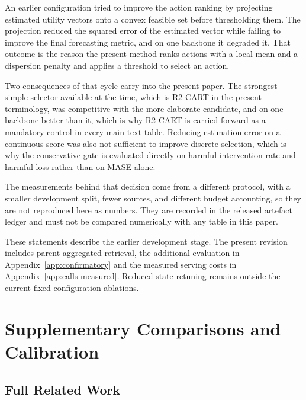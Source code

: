 \documentclass{article}
\begin{document}
An earlier configuration tried to improve the action ranking by projecting estimated utility
vectors onto a convex feasible set before thresholding them. The projection reduced the squared
error of the estimated vector while failing to improve the final forecasting metric, and on one
backbone it degraded it. That outcome is the reason the present method ranks actions with a
local mean and a dispersion penalty and applies a threshold to select an action.

Two consequences of that cycle carry into the present paper. The strongest simple selector
available at the time, which is R2-CART in the present terminology, was competitive with the
more elaborate candidate, and on one backbone better than it, which is why R2-CART is carried
forward as a mandatory control in every main-text table. Reducing estimation error on a
continuous score was also not sufficient to improve discrete selection, which is why the
conservative gate is evaluated directly on harmful intervention rate and harmful loss rather
than on MASE alone.

The measurements behind that decision come from a different protocol, with a smaller
development split, fewer sources, and different budget accounting, so they are not reproduced
here as numbers. They are recorded in the released artefact ledger and must not be compared
numerically with any table in this paper.

These statements describe the earlier development stage. The present revision includes
parent-aggregated retrieval, the additional evaluation in Appendix~\ref{app:confirmatory}
and the measured serving costs in Appendix~\ref{app:calls-measured}. Reduced-state retuning
remains outside the current fixed-configuration ablations.


\section{Supplementary Comparisons and Calibration}
\label{app:layout-details}
\subsection{Full Related Work}
\label{sec:related}
\end{document}
